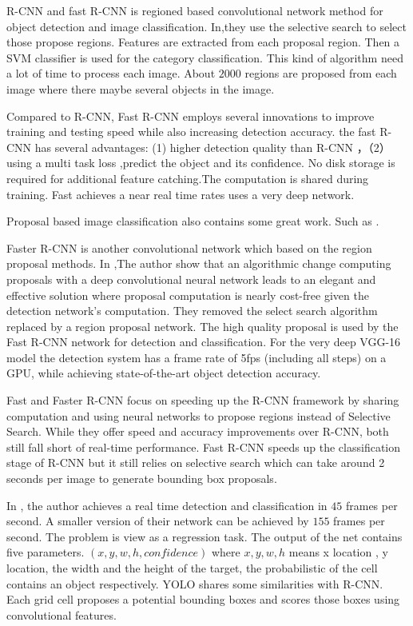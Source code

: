 \documentclass[10pt,twocolumn,letterpaper]{article}
\begin{document}
R-CNN and fast R-CNN is regioned based convolutional network method for object detection and image classification. In\cite{DSDFGVFB},they use the selective search to select those propose regions. Features are extracted from each proposal region. Then a SVM classifier is used for the category classification. This kind of algorithm need a  lot of time to process each image.  About $2000$ regions are proposed from each image where there maybe several objects in the image.


Compared to R-CNN\cite{DSDFGVFB}, Fast R-CNN\cite{girshick2015fast} employs several innovations to improve training and testing speed while also increasing detection accuracy. the fast R-CNN has several advantages: (1) higher detection quality  than  R-CNN ，（2） using  a multi task loss ,predict the object and its confidence. No disk storage is required for additional feature catching.The computation is shared during training. Fast achieves a near real time rates uses a very deep network.

Proposal based image classification also contains some great work. Such as \cite{ren2017faster}\cite{redmon2016you}\cite{Redmon2016YOLO9000}\cite{yolov3}.



Faster R-CNN\cite{ren2017faster} is another convolutional network which based on the region proposal methods. In \cite{ren2017faster},The author show that an algorithmic change computing proposals with a deep convolutional neural network leads to an elegant and effective solution where proposal computation is nearly cost-free given the detection network’s computation. They removed the select search algorithm replaced by a region proposal network.
The high quality proposal is used by the Fast R-CNN network for detection and classification. For the very deep VGG-16 model the detection system has a frame rate of 5fps (including all steps) on a GPU, while achieving state-of-the-art object detection accuracy.


Fast and Faster R-CNN focus on speeding up the R-CNN framework by sharing computation and using neural networks to propose regions instead
of Selective Search. While they offer speed and accuracy improvements over R-CNN, both still fall short of real-time performance.
Fast R-CNN speeds up the classification stage of R-CNN but it still relies on selective search which can take around 2 seconds per image to generate bounding box proposals.


In \cite{redmon2016you}, the author achieves a real time detection and classification in $45$  frames per second. A smaller version of their network can be achieved by $ 155$ frames per second. The problem is view as a regression task. The output of the net contains five parameters. $(x,y,w,h,confidence)$ where $x,y,w,h$ means x location , y  location, the width and the height of the target, the probabilistic of the cell contains an object respectively. YOLO shares some similarities with R-CNN. Each grid
cell proposes a potential bounding boxes and scores those boxes using convolutional features.
\end{document}
